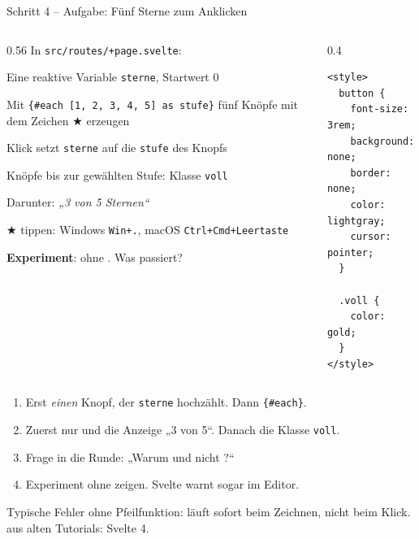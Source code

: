 \begin{frame}[fragile]{Schritt 4 -- Aufgabe: Fünf Sterne zum Anklicken}
  \footnotesize
  \begin{columns}[onlytextwidth,t]
    \begin{column}{0.56\textwidth}
      In \texttt{src/routes/+page.svelte}:
      \begin{tugenumerate}
        \item Eine reaktive Variable \texttt{sterne}, Startwert 0
        \item Mit \texttt{\{\#each [1, 2, 3, 4, 5] as stufe\}} fünf Knöpfe
              mit dem Zeichen ★ erzeugen
        \item Klick setzt \texttt{sterne} auf die \texttt{stufe} des Knopfs
        \item Knöpfe bis zur gewählten Stufe: Klasse \texttt{voll}
        \item Darunter: \emph{„3 von 5 Sternen“}
      \end{tugenumerate}
      \vspace{0.3em}
      ★ tippen: Windows \texttt{Win+.}, macOS \texttt{Ctrl+Cmd+Leertaste}

      \vspace{0.4em}
      \textbf{Experiment}:  ohne . Was passiert?
    \end{column}
    \begin{column}{0.4\textwidth}
\begin{lstlisting}[style=svelte,numbers=none]
<style>
  button {
    font-size: 3rem;
    background: none;
    border: none;
    color: lightgray;
    cursor: pointer;
  }

  .voll {
    color: gold;
  }
</style>
\end{lstlisting}
    \end{column}
  \end{columns}
\end{frame}

\begin{lecturer}
\begin{frame}{}
  \footnotesize
  \begin{enumerate}
    \item Erst \emph{einen} Knopf, der \texttt{sterne} hochzählt. Dann \texttt{\{\#each\}}.
    \item Zuerst nur  und die Anzeige „3 von 5“. Danach die Klasse \texttt{voll}.
    \item Frage in die Runde: „Warum  und nicht \code{===}?“
    \item Experiment ohne  zeigen. Svelte warnt sogar im Editor.
  \end{enumerate}
  \begin{block}{Typische Fehler}
     ohne Pfeilfunktion: läuft sofort beim Zeichnen,
    nicht beim Klick.  aus alten Tutorials: Svelte 4.
  \end{block}
\end{frame}
\end{lecturer}

